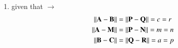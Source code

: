 \begin{enumerate}[label=\thesection.\arabic*.,ref=\thesection.\theenumi]
	
\item 	given that $\to$
\begin{align}
\left\lVert\mathbf{A}-\mathbf{B}\right\rVert &= \left\lVert\mathbf{P}-\mathbf{Q}\right\rVert = c = r
\\ 
\left\lVert\mathbf{A}-\mathbf{M}\right\rVert &= \left\lVert\mathbf{P}-\mathbf{N}\right\rVert = m = n
\\ 
\left\lVert\mathbf{B}-\mathbf{C}\right\rVert &= \left\lVert\mathbf{Q}-\mathbf{R}\right\rVert = a = p
\end{align}

%
\end{enumerate}
